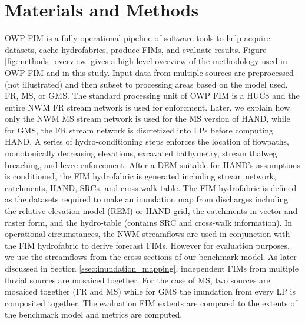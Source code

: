 \section{Materials and Methods}
\label{sec:materials_and_methods}
%
OWP FIM is a fully operational pipeline of software tools to help acquire datasets, cache hydrofabrics, produce FIMs, and evaluate results.
Figure \ref{fig:methods_overview} gives a high level overview of the methodology used in OWP FIM and in this study.
Input data from multiple sources are preprocessed (not illustrated) and then subset to processing areas based on the model used, FR, MS, or GMS.
The standard processing unit of OWP FIM is a HUC8 and the entire NWM FR stream network is used for enforcment.
Later, we explain how only the NWM MS stream network is used for the MS version of HAND, while for GMS, the FR stream network is discretized into LPs before computing HAND.
A series of hydro-conditioning steps enforces the location of flowpaths, monotonically decreasing elevations, excavated bathymetry, stream thalweg breaching, and levee enforcement.
After a DEM suitable for HAND's assumptions is conditioned, the FIM hydrofabric is generated including stream network, catchments, HAND, SRCs, and cross-walk table.
The FIM hydrofabric is defined as the datasets required to make an inundation map from discharges including the relative elevation model (REM) or HAND grid, the catchments in vector and raster form, and the hydro-table (contains SRC and cross-walk information).
In operational circumstances, the NWM streamflows are used in conjunction with the FIM hydrofabric to derive forecast FIMs.
However for evaluation purposes, we use the streamflows from the cross-sections of our benchmark model.
As later discussed in Section \ref{ssec:inundation_mapping}, independent FIMs from multiple fluvial sources are mosaiced together.
For the case of MS, two sources are mosaiced together (FR and MS) while for GMS the inundation from every LP is composited together.
The evaluation FIM extents are compared to the extents of the benchmark model and metrics are computed.
%
